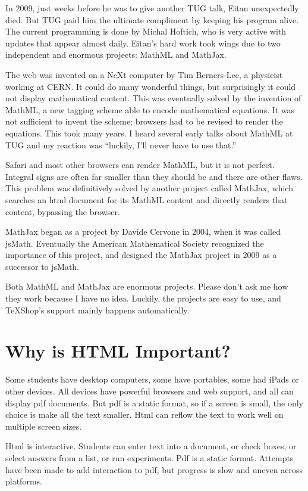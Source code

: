 \documentclass[11pt, oneside]{article}   	%
\begin{document}
In 2009, just weeks before he was to give another TUG talk, Eitan unexpectedly died. But TUG paid him the ultimate compliment by keeping his program alive. The current programming is done by Michal Hoftich, who is very active with updates that appear almost daily. Eitan's hard work took wings due to two independent and enormous projects: MathML and MathJax. 

The web was invented on a NeXt computer by Tim Berners-Lee, a physicist working at CERN. It could do many wonderful things, but surprisingly it could not display mathematical content. This was eventually solved by the invention of MathML, a new tagging scheme able to encode mathematical equations. It was not sufficient to invent the scheme; browsers had to be revised to render the equations. This took many years. I heard several early talks about MathML at TUG and my reaction was ``luckily, I'll never have to use that.'' 

Safari and most other browsers can render MathML, but it is not perfect. Integral signs are often far smaller than they should be and there are other flaws. This problem was definitively solved by another project called MathJax, which searches an html document for its MathML content and directly renders that content, bypassing the browser. 

MathJax began as a project by Davide Cervone in 2004, when it was called jsMath. Eventually the American Mathematical Society recognized the importance of this project, and designed the MathJax project in 2009 as a successor to jsMath. 

Both MathML and MathJax are enormous projects. Please don't ask me how they work because I have no idea. Luckily, the projects are  easy to use, and TeXShop's support mainly happens automatically. 

\section{Why is HTML Important?}

Some students have desktop computers, some have portables, some had iPads or other devices. All devices  have  powerful browsers and web support, and all can display pdf documents. But pdf is a static format, so if a screen is small, the only choice is make all the text smaller. Html can reflow the text to work well on multiple screen sizes.

Html is interactive. Students can enter text into a document, or check boxes, or select answers from a list, or run experiments. Pdf is a static format. Attempts have been made to add interaction to pdf, but progress is slow and uneven across platforms.
\end{document}
